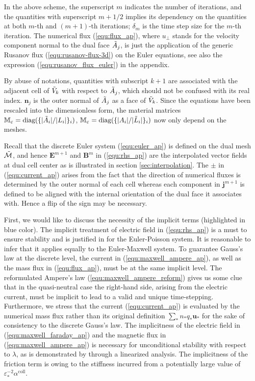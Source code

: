 \documentclass{report}
\begin{document}
In the above scheme, the superscript $m$ indicates the number of iterations, and the quantities with superscript $m+1/2$ implies its dependency on the quantities at both $m$-th and $(m+1)$-th iterations; $\delta_m$ is the time step size for the $m$-th iteration. The numerical flux (\ref{equ:flux_ap}), where $u_\perp$ stands for the velocity component normal to the dual face $\Tilde{A}_j$, is just the application of the generic Rusanov flux (\ref{equ:rusanov-flux-3d}) on the Euler equations, see also the expression (\ref{equ:rusanov_flux_euler}) in the appendix.  

By abuse of notations, quantities with subscript $k+1$ are associated with the adjacent cell of $\Tilde{V}_k$ with respect to $\Tilde{A}_j$, which should not be confused with its real index. $\mathbf{n}_j$ is the outer normal of $\Tilde{A}_j$ as a face of $\Tilde{V}_k$. Since the equations have been rescaled into the dimensionless form, the material matrices $\mathbb{M}_\varepsilon = \text{diag}(\{|\Tilde{A}_i|/{|L_i|}\}_i)$, $\mathbb{M}_\varepsilon = \text{diag}(\{{|A_i|}/{|\Tilde{L}_i|}\}_i)$ now only depend on the meshes. 

Recall that the discrete Euler system (\ref{equ:euler_ap}) is defined on the dual mesh $\Tilde{\mathcal{M}}$, and hence $\mathbf{E}^{m+1}$ and $\mathbf{B}^m$ in (\ref{equ:rhs_ap}) are the interpolated vector fields at dual cell center as is illustrated in section \ref{sec:interpolation}. The $\pm$ in (\ref{equ:current_ap}) arises from the fact that the direction of numerical fluxes is determined by the outer normal of each cell whereas each component in $\mathbf{j}^{m+1}$ is defined to be aligned with the internal orientation of the dual face it associates with. Hence a flip of the sign may be necessary. 

First, we would like to discuss the necessity of the implicit terms (highlighted in blue color). The implicit treatment of electric field in (\ref{equ:rhs_ap}) is a must to ensure stability and is justified in \cite{fabre_1992} for the Euler-Poisson system. It is reasonable to infer that it applies equally to the Euler-Maxwell system. To guarantee Gauss's law at the discrete level, the current in (\ref{equ:maxwell_ampere_ap}), as well as the mass flux in (\ref{equ:flux_ap}), must be at the same implicit level. The reformulated Ampere's law (\ref{equ:maxwell_ampere_reform}) gives us some clue that in the quasi-neutral case the right-hand side, arising from the electric current, must be implicit to lead to a valid and unique time-stepping. Furthermore, we stress that the current (\ref{equ:current_ap}) is evaluated by the numerical mass flux rather than its original definition $\sum_*n_*q_*\mathbf{u}_*$ for the sake of consistency to the discrete Gauss's law. The implicitness of the electric field in (\ref{equ:maxwell_faraday_ap}) and the magnetic flux in (\ref{equ:maxwell_ampere_ap}) is necessary for unconditional stability with respect to $\lambda$, as is demonstrated by \cite{degond_2012} through a linearized analysis. The implicitness of the friction term is owing to the stiffness incurred from a potentially large value of $\varepsilon^{-2}_*\alpha^\text{coll}$.
\end{document}
